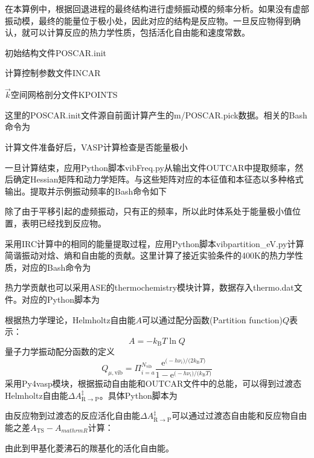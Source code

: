 在本算例中，根据回退进程的最终结构进行虚频振动模的频率分析。如果没有虚部振动模，最终的能量位于极小处，因此对应的结构是反应物。一旦反应物得到确认，就可以计算反应的热力学性质，包括活化自由能和速度常数。

初始结构文件\textrm{POSCAR.init}

计算控制参数文件\textrm{INCAR}

$\vec k$空间网格剖分文件\textrm{KPOINTS}

这里的\textrm{POSCAR.init}文件源自前面计算产生的\textrm{m/POSCAR.pick}数据。相关的\textrm{Bash}命令为

计算文件准备好后，\textrm{VASP}计算检查是否能量极小

一旦计算结束，应用\textrm{Python}脚本\textrm{vibFreq.py}从输出文件\textrm{OUTCAR}中提取频率，然后确定\textrm{Hessian}矩阵和动力学矩阵。与这些矩阵对应的本征值和本征态以多种格式输出。提取并示例振动频率的\textrm{Bash}命令如下

除了由于平移引起的虚频振动，只有正的频率，所以此时体系处于能量极小值位置，表明已经找到反应物。

采用\textrm{IRC}计算中的相同的能量提取过程，应用\textrm{Python}脚本\textrm{vibpartition\_eV.py}计算简谐振动对焓、熵和自由能的贡献。这里计算了接近实验条件的\textrm{400K}的热力学性质，对应的\textrm{Bash}命令为

热力学贡献也可以采用\textrm{ASE}的\textrm{thermochemistry}模块计算，数据存入\textrm{thermo.dat}文件。对应的\textrm{Python}脚本为

根据热力学理论，\textrm{Helmholtz}自由能$A$可以通过配分函数\textrm{(Partition function)}$Q$表示：
\begin{displaymath}
	A=-k_{\mathrm{B}}T\ln Q
\end{displaymath}
量子力学振动配分函数的定义
\begin{displaymath}
	Q_{\mu,\mathrm{vib}}=\Pi_{i=a}^{N_{\mathrm{vib}}}\dfrac{\mathrm{e}^{\bigg(-h\nu_i\bigg)/\bigg(2k_{\mathrm{B}}T\bigg)}}{1-\mathrm{e}^{\bigg(-h\nu_i\bigg)/\bigg(k_{\mathrm{B}}T\bigg)}}
\end{displaymath}
采用\textrm{Py4vasp}模块，根据振动自由能和\textrm{OUTCAR}文件中的总能，可以得到过渡态\textrm{Helmholtz}自由能$\Delta A_{\mathrm{R}\rightarrow\mathrm{P}}^{\ddagger}$。具体\textrm{Python}脚本为

由反应物到过渡态的反应活化自由能$\Delta A_{\mathrm{R}\rightarrow\mathrm{P}}^{\ddagger}$可以通过过渡态自由能和反应物自由能之差$A_{\mathrm{TS}}-A_{mathrm{R}}$计算：

由此到甲基化菱沸石的羰基化的活化自由能。

